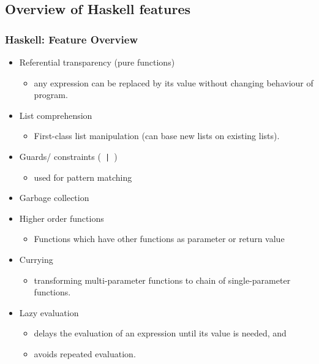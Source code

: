 \subsection{Overview of Haskell features}

\begin{frame}
  \frametitle{Haskell: Feature Overview}
  \begin{itemize}
    \item Referential transparency (pure functions)
      \begin{itemize}
        \item any expression can be replaced by its value without changing behaviour of program.
      \end{itemize}
    \item List comprehension 
      \begin{itemize}
        \item First-class list manipulation (can base new lists on existing lists).
      \end{itemize}
    \item Guards/ constraints  (\texttt{ | })
      \begin{itemize}
        \item used for pattern matching
      \end{itemize}   
    \item Garbage collection 
    \item Higher order functions
      \begin{itemize}
        \item Functions which have other functions as parameter or return value
      \end{itemize}
    \item Currying 
      \begin{itemize}
        \item transforming multi-parameter functions to chain of single-parameter functions.
      \end{itemize}
    \item Lazy evaluation
      \begin{itemize}
        \item delays the evaluation of an expression until its value is needed, and
        \item avoids repeated evaluation.
      \end{itemize}
  \end{itemize}
\end{frame}